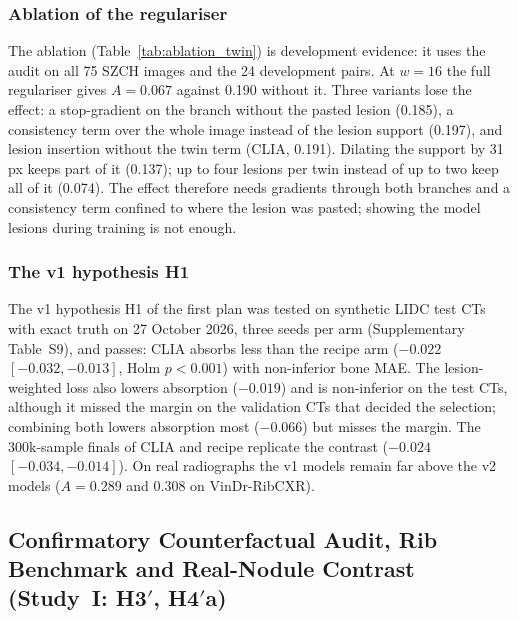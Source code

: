 \subsubsection{Ablation of the regulariser}
The ablation (Table~\ref{tab:ablation_twin}) is development evidence: it uses the audit on all 75 SZCH images and the 24 development pairs.
At $w=16$ the full regulariser gives $A=0.067$ against 0.190 without it. Three variants lose the effect: a stop-gradient on the branch
without the pasted lesion (0.185), a consistency term over the whole image instead of the lesion support (0.197), and lesion insertion
without the twin term (CLIA, 0.191). Dilating the support by 31\,px keeps part of it (0.137); up to four lesions per twin instead of up to
two keep all of it (0.074). The effect therefore needs gradients through both branches and a consistency term confined to where the lesion
was pasted; showing the model lesions during training is not enough.

\begin{table}[!t]
\centering
\caption{Ablation of the twin regulariser at $w=16$ (SwinV2-T, 300k samples, mean over seeds): one factor changed per row. Development
evidence: audit on all 75 SZCH images, bone PSNR$_{\mathrm{cal}}$ on the 24 development pairs.}
\label{tab:ablation_twin}
\end{table}

\subsubsection{The v1 hypothesis H1}
The v1 hypothesis H1 of the first plan was tested on synthetic LIDC test CTs with exact truth on 27 October 2026, three seeds per arm
(Supplementary Table~S9), and passes: CLIA absorbs less than the recipe arm ($-0.022$ $[-0.032,-0.013]$, Holm $p<0.001$) with non-inferior
bone MAE. The lesion-weighted loss also lowers absorption ($-0.019$) and is non-inferior on the test CTs, although it missed the margin on
the validation CTs that decided the selection; combining both lowers absorption most ($-0.066$) but misses the margin. The 300k-sample finals
of CLIA and recipe replicate the contrast ($-0.024$ $[-0.034,-0.014]$). On real radiographs the v1 models remain far above the v2 models
($A=0.289$ and 0.308 on VinDr-RibCXR).

\subsection{Confirmatory Counterfactual Audit, Rib Benchmark and Real-Nodule Contrast (Study~I: H3\texorpdfstring{$'$}{'},
H4\texorpdfstring{$'$}{'}a)}
\label{sec:res-audit}

